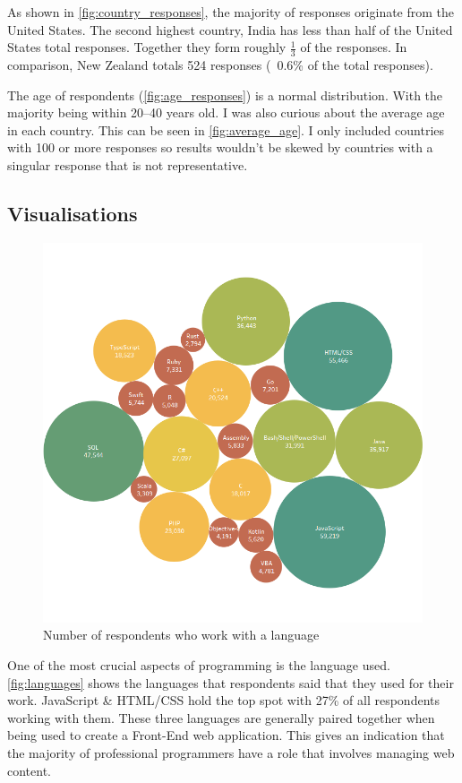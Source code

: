 \documentclass{scrartcl}
\begin{document}
As shown in \autoref{fig:country_responses}, the majority of responses originate from the United States. The second highest country, India has less than half of the United States total responses. Together they form roughly \(\frac{1}{3}\) of the responses. In comparison, New Zealand totals \num{524} responses (~0.6\% of the total responses).

The age of respondents (\autoref{fig:age_responses}) is a normal distribution. With the majority being within \numrange{20}{40} years old. I was also curious about the average age in each country. This can be seen in \autoref{fig:average_age}. I only included countries with 100 or more responses so results wouldn't be skewed by countries with a singular response that is not representative.

\subsection{Visualisations}
\begin{figure}[p]
    \centering
    \includegraphics[width=\linewidth]{Documentation/images/languages.png}
    \caption{Number of respondents who work with a language}
    \label{fig:languages}
\end{figure}
One of the most crucial aspects of programming is the language used. \autoref{fig:languages} shows the languages that respondents said that they used for their work. JavaScript \& HTML/CSS hold the top spot with 27\% of all respondents working with them. These three languages are generally paired together when being used to create a Front-End web application. This gives an indication that the majority of professional programmers have a role that involves managing web content.
\end{document}
